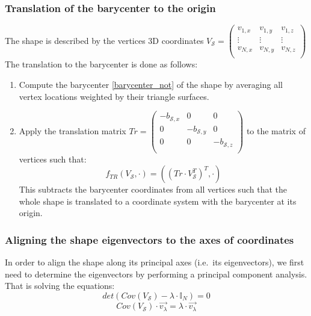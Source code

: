 \subsubsection{Translation of the barycenter to the origin}
The shape is described by the vertices 3D coordinates $V_{\mathcal{S}} = 
\begin{pmatrix}
    v_{1,x} & v_{1,y} & v_{1,z} \\
    \vdots & \vdots & \vdots \\
    v_{N,x} & v_{N,y} & v_{N,z} \\
\end{pmatrix}$
The translation to the barycenter is done as follows:
\begin{enumerate}
    \item Compute the barycenter \ref{barycenter_not} of the shape by averaging all vertex locations weighted by their triangle surfaces.
    \item Apply the translation matrix $Tr =
        \begin{pmatrix}
        -b_{\mathcal{S},x} & 0 & 0 \\
        0 & -b_{\mathcal{S},y} & 0 \\
        0 & 0 & -b_{\mathcal{S},z} \\
        \end{pmatrix}$
to the matrix of vertices such that:
\begin{equation}
    f_{TR}(V_{\mathcal{S}}, \cdot) = ((Tr \cdot V_{\mathcal{S}}^T)^T, \cdot)
\end{equation}
This subtracts the barycenter coordinates from all vertices such that the whole shape is translated to a coordinate
system with the barycenter at its origin.
\end{enumerate}


\subsubsection{Aligning the shape eigenvectors to the axes of coordinates}
In order to align the shape along its principal axes (i.e.\ its eigenvectors), we first need to determine the
eigenvectors by performing a principal component analysis.
That is solving the equations:
\begin{equation}
    det(Cov(V_{\mathcal{S}}) - \lambda \cdot \mathbb{I}_N) = 0
\end{equation}
\begin{equation}
    Cov(V_{\mathcal{S}}) \cdot \overrightarrow{v_{\lambda}} = \lambda \cdot \overrightarrow{v_{\lambda}}
\end{equation}

